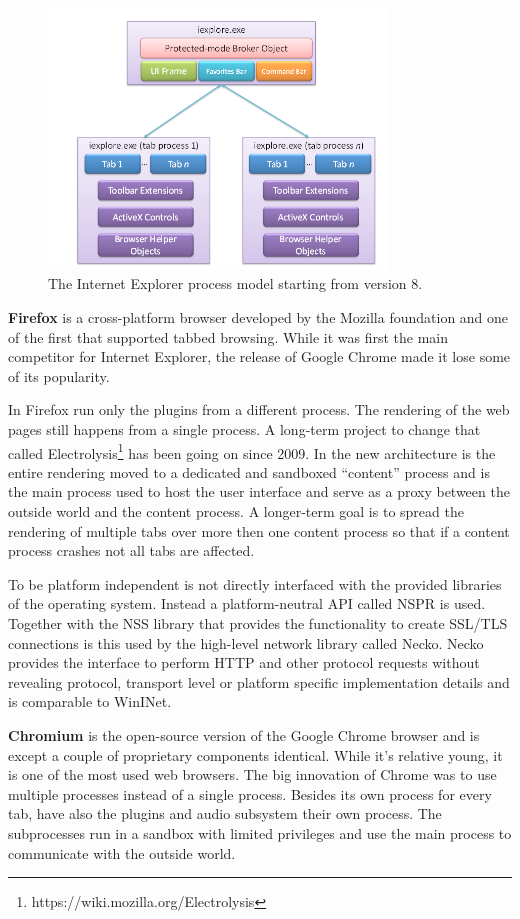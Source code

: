 \begin{figure}
    \centering
    \includegraphics[width=9cm]{Images/IE8_process_model.png}
    \caption{The Internet Explorer process model starting from version 8. \cite{IE8LCIEP}}
    \label{fig:ie8proc}
\end{figure}

\textbf{Firefox} is a cross-platform browser developed by the Mozilla foundation and one of the first that supported tabbed browsing. While it was first the main competitor for Internet Explorer, the release of Google Chrome made it lose some of its popularity.

In Firefox run only the plugins from a different process. The rendering of the web pages still happens from a single process. A long-term project to change that called Electrolysis\footnote{https://wiki.mozilla.org/Electrolysis} has been going on since 2009. In the new architecture is the entire rendering moved to a dedicated and sandboxed ``content'' process and is the main process used to host the user interface and serve as a proxy between the outside world and the content process. A longer-term goal is to spread the rendering of multiple tabs over more then one content process so that if a content process crashes not all tabs are affected.

To be platform independent is not directly interfaced with the provided libraries of the operating system. Instead a platform-neutral API called NSPR is used. Together with the NSS library that provides the functionality to create SSL/TLS connections is this used by the high-level network library called Necko. Necko provides the interface to perform HTTP and other protocol requests without revealing protocol, transport level or platform specific implementation details and is comparable to WinINet.

\textbf{Chromium} is the open-source version of the Google Chrome browser and is except a couple of proprietary components identical. While it's relative young, it is one of the most used web browsers. The big innovation of Chrome \cite{ChromeMPA} was to use multiple processes instead of a single process. Besides its own process for every tab, have also the plugins and audio subsystem their own process. The subprocesses run in a sandbox with limited privileges and use the main process to communicate with the outside world.


